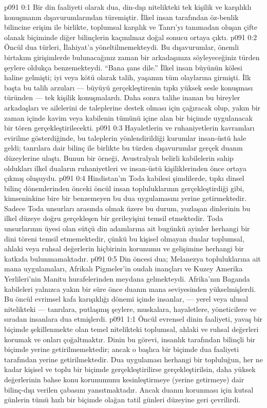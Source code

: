 \vs p091 0:1 Bir din faaliyeti olarak dua, din\hyp{}dışı nitelikteki tek kişilik ve karşılıklı konuşmanın dışavurumlarından türemiştir. İlkel insan tarafından öz\hyp{}benlik bilincine erişim ile birlikte, toplumsal karşılık ve Tanrı’yı tanımadan oluşan çifte olanak biçiminde diğer bilinçlerin kaçınılmaz doğal sonucu ortaya çıktı.
\vs p091 0:2 Öncül dua türleri, İlahiyat’a yöneltilmemekteydi. Bu dışavurumlar, önemli birtakım girişimlerde bulunacağınız zaman bir arkadaşınıza söyleyeceğiniz türden şeylere oldukça benzemekteydi. “Bana şans dile.” İlkel insan büyünün kölesi haline gelmişti; iyi veya kötü olarak talih, yaşamın tüm olaylarına girmişti. İlk başta bu talih arzuları --- büyüyü gerçekleştirenin tıpkı yüksek sesle konuşması türünden --- tek kişilik konuşmalardı. Daha sonra talihe inanan bu bireyler arkadaşları ve ailelerini de taleplerine destek olması için çağıracak olup, yakın bir zaman içinde kavim veya kabilenin tümünü içine alan bir biçimde uygulanacak bir tören gerçekleştirilecekti.
\vs p091 0:3 Hayaletlerin ve ruhaniyetlerin kavramları evirilme gösterdiğinde, bu taleplerin yönlendirildiği kurumlar insan\hyp{}üstü hale geldi; tanrılara dair bilinç ile birlikte bu türden dışavurumlar gerçek duanın düzeylerine ulaştı. Bunun bir örneği, Avustralyalı belirli kabilelerin sahip oldukları ilkel duaların ruhaniyetleri ve insan\hyp{}üstü kişiliklerinden önce ortaya çıkmış oluşuydu.
\vs p091 0:4 Hindistan’ın Toda kabilesi şimdilerde, tıpkı dinsel bilinç dönemlerinden önceki öncül insan topluluklarının gerçekleştirdiği gibi, kimseninkine bire bir benzemeyen bu dua uygulamasını yerine getirmektedir. Sadece Toda unsurları arasında olmak üzere bu durum, yozlaşan dinlerinin bu ilkel düzeye doğru gerçekleşen bir gerileyişini temsil etmektedir. Toda unsurlarının üyesi olan sütçü din adamlarına ait bugünkü ayinler herhangi bir dini töreni temsil etmemektedir, çünkü bu kişisel olmayan dualar toplumsal, ahlaki veya ruhsal değerlerin hiçbirinin korunumu ve gelişimine herhangi bir katkıda bulunmamaktadır.
\vs p091 0:5 Din öncesi dua; Melanezya topluluklarına ait mana uygulamaları, Afrikalı Pigmeler’in oudah inançları ve Kuzey Amerika Yerlileri’nin Manitu hurafelerinden meydana gelmekteydi. Afrika’nın Baganda kabileleri yalnızca yakın bir süre önce duanın mana seviyesinden yükselmişlerdi. Bu öncül evrimsel kafa karışıklığı dönemi içinde insanlar, --- yerel veya ulusal nitelikteki --- tanrılara, putlaşmış şeylere, muskalara, hayaletlere, yöneticilere ve sıradan insanlara dua etmişlerdi.
\vs p091 1:1 Öncül evrensel dinin faaliyeti, yavaş bir biçimde şekillenmekte olan temel nitelikteki toplumsal, ahlaki ve ruhsal değerleri korumak ve onları çoğaltmaktır. Dinin bu görevi, insanlık tarafından bilinçli bir biçimde yerine getirilmemektedir; ancak o başlıca bir biçimde dua faaliyeti tarafından yerine getirilmektedir. Dua uygulaması herhangi bir topluluğun, her ne kadar kişisel ve toplu bir biçimde gerçekleştirilirse gerçekleştirilsin, daha yüksek değerlerinin bahse konu korunumunu kesinleştirmeye (yerine getirmeye) dair bilinç\hyp{}dışı verilen çabasını yansıtmaktadır. Ancak duanın korunması için kutsal günlerin tümü hızlı bir biçimde olağan tatil günleri düzeyine geri çevrilirdi.
